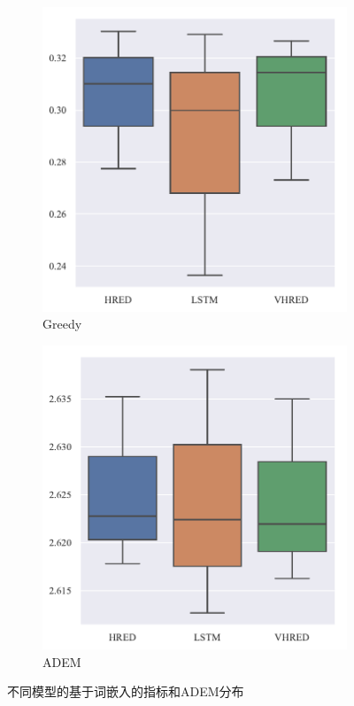 \begin{figure}[H]
    \begin{subfigure}{0.5\linewidth}
        \includegraphics[width=0.8\linewidth]{figure/boxplot/model/embedding_based_greedy_matching/plot.pdf}
        \centering
        \caption{Greedy}
    \end{subfigure}%
    \begin{subfigure}{0.5\linewidth}
        \includegraphics[width=0.8\linewidth]{figure/boxplot/model/adem/plot.pdf}
        \centering
        \caption{ADEM}
        \label{subfig:ADEM_model}
    \end{subfigure}
    \caption{不同模型的基于词嵌入的指标和ADEM分布}
    \label{fig:ADEM_EB_model}
\end{figure}
